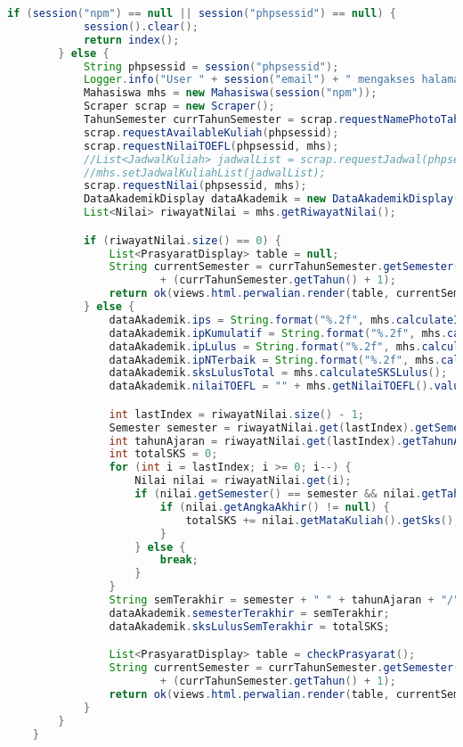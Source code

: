 \begin{lstlisting}[language=Java,basicstyle=\tiny,caption=Applicstion.java]
		if (session("npm") == null || session("phpsessid") == null) {
			session().clear();
			return index();
		} else {
			String phpsessid = session("phpsessid");
			Logger.info("User " + session("email") + " mengakses halaman prasyarat dari " + request().remoteAddress());
			Mahasiswa mhs = new Mahasiswa(session("npm"));
			Scraper scrap = new Scraper();
			TahunSemester currTahunSemester = scrap.requestNamePhotoTahunSemester(session("phpsessid"), mhs);
			scrap.requestAvailableKuliah(phpsessid);
			scrap.requestNilaiTOEFL(phpsessid, mhs);
			//List<JadwalKuliah> jadwalList = scrap.requestJadwal(phpsessid);
			//mhs.setJadwalKuliahList(jadwalList);
			scrap.requestNilai(phpsessid, mhs);
			DataAkademikDisplay dataAkademik = new DataAkademikDisplay();
			List<Nilai> riwayatNilai = mhs.getRiwayatNilai();

			if (riwayatNilai.size() == 0) {
				List<PrasyaratDisplay> table = null;
				String currentSemester = currTahunSemester.getSemester() + " " + currTahunSemester.getTahun() + "/"
						+ (currTahunSemester.getTahun() + 1);
				return ok(views.html.perwalian.render(table, currentSemester, dataAkademik));
			} else {
				dataAkademik.ips = String.format("%.2f", mhs.calculateIPS());
				dataAkademik.ipKumulatif = String.format("%.2f", mhs.calculateIPKumulatif());
				dataAkademik.ipLulus = String.format("%.2f", mhs.calculateIPLulus());
				dataAkademik.ipNTerbaik = String.format("%.2f", mhs.calculateIPTempuh(false));
				dataAkademik.sksLulusTotal = mhs.calculateSKSLulus();
				dataAkademik.nilaiTOEFL = "" + mhs.getNilaiTOEFL().values();

				int lastIndex = riwayatNilai.size() - 1;
				Semester semester = riwayatNilai.get(lastIndex).getSemester();
				int tahunAjaran = riwayatNilai.get(lastIndex).getTahunAjaran();
				int totalSKS = 0;
				for (int i = lastIndex; i >= 0; i--) {
					Nilai nilai = riwayatNilai.get(i);
					if (nilai.getSemester() == semester && nilai.getTahunAjaran() == tahunAjaran) {
						if (nilai.getAngkaAkhir() != null) {
							totalSKS += nilai.getMataKuliah().getSks();
						}
					} else {
						break;
					}
				}
				String semTerakhir = semester + " " + tahunAjaran + "/" + (tahunAjaran + 1);
				dataAkademik.semesterTerakhir = semTerakhir;
				dataAkademik.sksLulusSemTerakhir = totalSKS;

				List<PrasyaratDisplay> table = checkPrasyarat();
				String currentSemester = currTahunSemester.getSemester() + " " + currTahunSemester.getTahun() + "/"
						+ (currTahunSemester.getTahun() + 1);
				return ok(views.html.perwalian.render(table, currentSemester, dataAkademik));
			}
		}
	}


\end{lstlisting}
